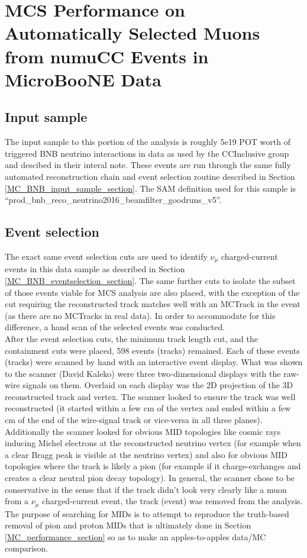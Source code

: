 \section{MCS Performance on Automatically Selected Muons from numuCC Events in MicroBooNE Data}\label{data_performance_section}

\subsection{Input sample}
The input sample to this portion of the analysis is roughly 5e19 POT worth of triggered BNB neutrino interactions in {\ub} data as used by the CCInclusive group and descibed in their interal note\cite{CCIncInternalNote}. These events are run through the same fully automated reconstruction chain and event selection routine described in Section \ref{MC_BNB_input_sample_section}. The SAM definition used for this sample is ``prod\_bnb\_reco\_neutrino2016\_beamfilter\_goodruns\_v5''.

\subsection{Event selection}
The exact same event selection cuts are used to identify $\nu_\mu$ charged-current events in this data sample as described in Section \ref{MC_BNB_eventselection_section}. The same further cuts to isolate the subset of those events viable for MCS analysis are also placed, with the exception of the cut requiring the reconstructed track matches well with an {\sc MCTrack} in the event (as there are no {\sc MCTracks} in real data). In order to accommodate for this difference, a hand scan of the selected events was conducted.\\

After the event selection cuts, the minimum track length cut, and the containment cuts were placed, 598 events (tracks) remained. Each of these events (tracks) were scanned by hand with an interactive event display. What was shown to the scanner (David Kaleko) were three two-dimensional displays with the raw-wire signals on them. Overlaid on each display was the 2D projection of the 3D reconstructed track and vertex. The scanner looked to ensure the track was well reconstructed (it started within a few cm of the vertex and ended within a few cm of the end of the wire-signal track or vice-versa in all three planes). Additionally the scanner looked for obvious MID topologies like cosmic rays inducing Michel electrons at the reconstructed neutrino vertex (for example when a clear Bragg peak is visible at the neutrino vertex) and also for obvious MID topologies where the track is likely a pion (for example if it charge-exchanges and creates a clear neutral pion decay topology). In general, the scanner chose to be conservative in the sense that if the track didn't look very clearly like a muon from a $\nu_\mu$ charged-current event, the track (event) was removed from the analysis. The purpose of searching for MIDs is to attempt to reproduce the truth-based removal of pion and proton MIDs that is ultimately done in Section \ref{MC_performance_section} so as to make an apples-to-apples data/MC comparison.\\

